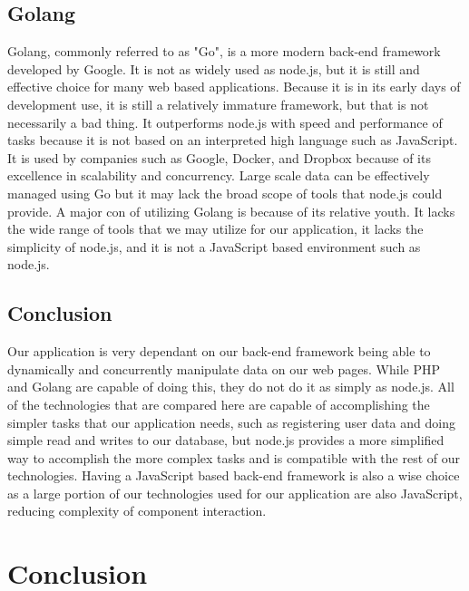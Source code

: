 \documentclass[onecolumn, draftclsnofoot,10pt, compsoc]{IEEEtran}
\begin{document}
	\subsection{Golang}
	
		Golang, commonly referred to as "Go", is a more modern back-end framework developed by Google. It is not as widely used as node.js, but it is still and effective choice 
		for many web based applications. Because it is in its early days of development use, it is still a relatively immature framework, but that is not necessarily a bad thing.
		It outperforms node.js with speed and performance of tasks because it is not based on an interpreted high language such as JavaScript. It is used by companies such as Google, 
		Docker, and Dropbox because of its excellence in scalability and concurrency. Large scale data can be effectively managed using Go but it may lack the broad scope of 
		tools that node.js could provide. A major con of utilizing Golang is because of its relative youth. It lacks the wide range of tools that we may
		utilize for our application, it lacks the simplicity of node.js, and it is not a JavaScript based environment such as node.js. 
	

	\subsection{Conclusion}
	
		Our application is very dependant on our back-end framework being able to dynamically and concurrently manipulate data on our web pages. 
		While PHP and Golang are capable of doing this, they do not do it as simply as node.js. All of the technologies that are compared here are
		capable of accomplishing the simpler tasks that our application needs, such as registering user data and doing simple read and writes to our database,
		but node.js provides a more simplified way to accomplish the more complex tasks and is compatible with the rest of our technologies. Having a JavaScript
		based back-end framework is also a wise choice as a large portion of our technologies used for our application are also JavaScript, reducing complexity of component interaction. 
	
\section{Conclusion}
\end{document}
